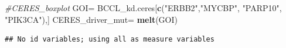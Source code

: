 \documentclass[]{article}
\newenvironment{Shaded}{\begin{snugshade}}{\end{snugshade}}
\newcommand{\CommentTok}[1]{\textcolor[rgb]{0.56,0.35,0.01}{\textit{#1}}}
\newcommand{\KeywordTok}[1]{\textcolor[rgb]{0.13,0.29,0.53}{\textbf{#1}}}
\newcommand{\NormalTok}[1]{#1}
\newcommand{\OperatorTok}[1]{\textcolor[rgb]{0.81,0.36,0.00}{\textbf{#1}}}
\newcommand{\StringTok}[1]{\textcolor[rgb]{0.31,0.60,0.02}{#1}}
\begin{document}
\begin{Shaded}
\begin{Highlighting}[]
\CommentTok{#CERES_boxplot}
\NormalTok{GOI=}\StringTok{ }\NormalTok{BCCL_kd.ceres[}\KeywordTok{c}\NormalTok{(}\StringTok{"ERBB2"}\NormalTok{,}\StringTok{"MYCBP"}\NormalTok{, }\StringTok{"PARP10"}\NormalTok{, }\StringTok{"PIK3CA"}\NormalTok{),]}
\NormalTok{CERES_driver_mut=}\StringTok{ }\KeywordTok{melt}\NormalTok{(GOI)}
\end{Highlighting}
\end{Shaded}

\begin{verbatim}
## No id variables; using all as measure variables
\end{verbatim}

\begin{Shaded}
\end{Shaded}
\end{document}
